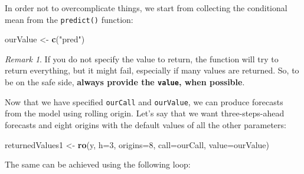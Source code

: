 \documentclass[]{book}
\newenvironment{Shaded}{\begin{snugshade}}{\end{snugshade}}
\newcommand{\DataTypeTok}[1]{\textcolor[rgb]{0.13,0.29,0.53}{#1}}
\newcommand{\DecValTok}[1]{\textcolor[rgb]{0.00,0.00,0.81}{#1}}
\newcommand{\KeywordTok}[1]{\textcolor[rgb]{0.13,0.29,0.53}{\textbf{#1}}}
\newcommand{\NormalTok}[1]{#1}
\newcommand{\StringTok}[1]{\textcolor[rgb]{0.31,0.60,0.02}{#1}}
\theoremstyle{definition}
\theoremstyle{definition}
\theoremstyle{definition}
\theoremstyle{definition}
\theoremstyle{remark}
\newtheorem*{remark}{Remark}
\begin{document}
In order not to overcomplicate things, we start from collecting the conditional mean from the \texttt{predict()} function:

\begin{Shaded}
\begin{Highlighting}[]
\NormalTok{ourValue <-}\StringTok{ }\KeywordTok{c}\NormalTok{(}\StringTok{"pred"}\NormalTok{)}
\end{Highlighting}
\end{Shaded}

\begin{remark}
If you do not specify the value to return, the function will try to return everything, but it might fail, especially if many values are returned. So, to be on the safe side, \textbf{always provide the \texttt{value}, when possible}.
\end{remark}

Now that we have specified \texttt{ourCall} and \texttt{ourValue}, we can produce forecasts from the model using rolling origin. Let's say that we want three-steps-ahead forecasts and eight origins with the default values of all the other parameters:

\begin{Shaded}
\begin{Highlighting}[]
\NormalTok{returnedValues1 <-}\StringTok{ }\KeywordTok{ro}\NormalTok{(y, }\DataTypeTok{h=}\DecValTok{3}\NormalTok{, }\DataTypeTok{origins=}\DecValTok{8}\NormalTok{,}
                      \DataTypeTok{call=}\NormalTok{ourCall, }\DataTypeTok{value=}\NormalTok{ourValue)}
\end{Highlighting}
\end{Shaded}

The same can be achieved using the following loop:
\end{document}
